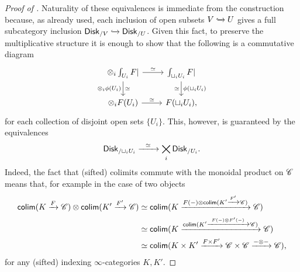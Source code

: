 \documentclass[../text]{subfiles}
\begin{document}
\begin{proof}[Proof of {}]
    Naturality of these equivalences is immediate from the construction because, as already used, each inclusion of open subsets $V \xhookrightarrow{} U$ gives a full subcategory inclusion $\disk[r]_{/V} \xhookrightarrow{} \disk[r]_{/U}$. Given this fact, to preserve the multiplicative structure it is enough to show that the following is a commutative diagram
    \begin{equation}\label{eq:mult_strut_comm_square}
        \begin{tikzcd}
            \otimes_i \int_{U_i} F| \arrow[r, "\simeq"] \arrow[d, "\otimes_i \phi (U_i)"', "\simeq"] & \int_{\sqcup_i U_i} F| \arrow[d, "\phi (\sqcup_i U_i)", "\simeq"']\\
            \otimes_i F (U_i) \arrow[r, "\simeq"] & F (\sqcup_i U_i),
        \end{tikzcd}
    \end{equation}
    for each collection of disjoint open sets $\{U_i\}$. This, however, is guaranteed by the equivalences
    \begin{equation}
        \disk[r]_{/\sqcup_i U_i} \xrightarrow{\ \ \simeq \ \ } \bigtimes_i \disk[r]_{/U_i}.
    \end{equation}
    Indeed, the fact that (sifted) colimits commute with the monoidal product on $\mathscr{C}$ means that, for example in the case of two objects
    \begin{align}
        \mathsf{colim}(K \xrightarrow{F} \mathscr{C}) \otimes \mathsf{colim}(K' \xrightarrow{F'} \mathscr{C}) &\simeq \mathsf{colim}(K \xrightarrow{F(-) \otimes \mathsf{colim}(K' \xrightarrow{F'} \mathscr{C})} \mathscr{C})\notag\\
        &\simeq \mathsf{colim}(K \xrightarrow{\mathsf{colim}(K' \xrightarrow{F(-) \otimes F'(-)} \mathscr{C})} \mathscr{C})\notag\\
        &\simeq \mathsf{colim}(K \times K' \xrightarrow{F \times F'} \mathscr{C} \times \mathscr{C} \xrightarrow{- \otimes -} \mathscr{C}),
    \end{align}
    for any (sifted) indexing $\infty$-categories $K, K'$.


\end{proof}
\end{document}
